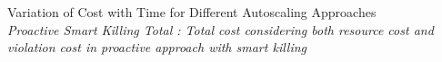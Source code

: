 Variation of Cost with Time for Different Autoscaling Approaches\\
\textit{Proactive Smart Killing Total : Total cost considering both resource cost and violation cost in proactive approach with smart killing}
